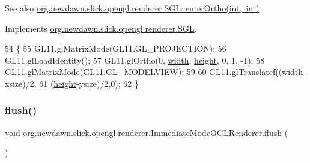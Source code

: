 \begin{DoxySeeAlso}{See also}
\mbox{\hyperlink{interfaceorg_1_1newdawn_1_1slick_1_1opengl_1_1renderer_1_1_s_g_l_a703b23e860de8e89ed9380d598a8a4bc}{org.\+newdawn.\+slick.\+opengl.\+renderer.\+S\+G\+L\+::enter\+Ortho(int, int)}} 
\end{DoxySeeAlso}


Implements \mbox{\hyperlink{interfaceorg_1_1newdawn_1_1slick_1_1opengl_1_1renderer_1_1_s_g_l_a703b23e860de8e89ed9380d598a8a4bc}{org.\+newdawn.\+slick.\+opengl.\+renderer.\+S\+GL}}.


\begin{DoxyCode}
54                                                  \{
55         GL11.glMatrixMode(GL11.GL\_PROJECTION);
56         GL11.glLoadIdentity();
57         GL11.glOrtho(0, \mbox{\hyperlink{classorg_1_1newdawn_1_1slick_1_1opengl_1_1renderer_1_1_immediate_mode_o_g_l_renderer_a65d0a04d747368ea954f69074d9102d6}{width}}, \mbox{\hyperlink{classorg_1_1newdawn_1_1slick_1_1opengl_1_1renderer_1_1_immediate_mode_o_g_l_renderer_aec68994a0ee3b7b478122af823c8a8d7}{height}}, 0, 1, -1);
58         GL11.glMatrixMode(GL11.GL\_MODELVIEW);
59         
60         GL11.glTranslatef((\mbox{\hyperlink{classorg_1_1newdawn_1_1slick_1_1opengl_1_1renderer_1_1_immediate_mode_o_g_l_renderer_a65d0a04d747368ea954f69074d9102d6}{width}}-xsize)/2,
61                           (\mbox{\hyperlink{classorg_1_1newdawn_1_1slick_1_1opengl_1_1renderer_1_1_immediate_mode_o_g_l_renderer_aec68994a0ee3b7b478122af823c8a8d7}{height}}-ysize)/2,0);
62     \}
\end{DoxyCode}
\mbox{\label{classorg_1_1newdawn_1_1slick_1_1opengl_1_1renderer_1_1_immediate_mode_o_g_l_renderer_afe7b9f862d9e3c25ade32c1de777577b}} 
\subsubsection{\texorpdfstring{flush()}{flush()}}
{\footnotesize\ttfamily void org.\+newdawn.\+slick.\+opengl.\+renderer.\+Immediate\+Mode\+O\+G\+L\+Renderer.\+flush (\begin{DoxyParamCaption}{ }\end{DoxyParamCaption})\hspace{0.3cm}{\ttfamily [inline]}}

